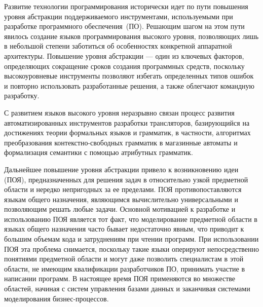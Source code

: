 Развитие технологии программирования исторически идет по пути повышения уровня абстракции поддерживаемого инструментами, используемыми при разработке программного обеспечения~(ПО). Решающим шагом на этом пути явилось создание языков программирования высокого уровня, позволяющих лишь в небольшой степени заботиться об особенностях конкретной аппаратной архитектуры. Повышение уровня абстракции --- один из ключевых факторов, определяющих сокращение сроков создания программных средств, поскольку высокоуровневые инструменты позволяют избегать определенных типов ошибок и повторно использовать разработанные решения, а также облегчают командную разработку.

С развитием языков высокого уровня неразрывно связан процесс развития автоматизированных инструментов разработки трансляторов, базирующийся на достижениях теории формальных языков и грамматик, в частности, алгоритмах преобразования контекстно-свободных грамматик в магазинные автоматы и формализация семантики с помощью атрибутных грамматик.

Дальнейшее повышение уровня абстракции привело к возникновению идеи  (ПОЯ), предназначенных для решения задач в относительно узкой предметной области и нередко непригодных за ее пределами. ПОЯ противопоставляются языкам общего назначения, являющимся вычислительно универсальными и позволяющим решать любые задачи. Основной мотивацией к разработке и использованию ПОЯ является тот факт, что моделирование предметной области в языках общего назначения часто бывает недостаточно явным, что приводит к большим объемам кода и затруднениям при чтении программ. При использовании ПОЯ эта проблема снимается, поскольку такие языки оперируют непосредственно понятиями предметной области и могут даже позволить специалистам в этой области, не имеющим квалификации разработчиков ПО, принимать участие в написании программ. В настоящее время ПОЯ применяются во множестве областей, начиная с систем управления базами данных и заканчивая системами моделирования бизнес-процессов.

